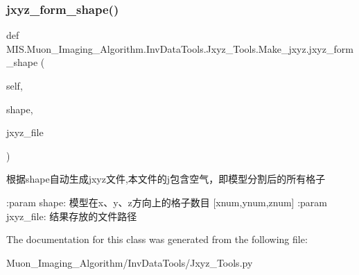 \subsubsection{\texorpdfstring{jxyz\+\_\+form\+\_\+shape()}{jxyz\_form\_shape()}}
{\footnotesize\ttfamily def M\+I\+S.\+Muon\+\_\+\+Imaging\+\_\+\+Algorithm.\+Inv\+Data\+Tools.\+Jxyz\+\_\+\+Tools.\+Make\+\_\+jxyz.\+jxyz\+\_\+form\+\_\+shape (\begin{DoxyParamCaption}\item[{}]{self,  }\item[{}]{shape,  }\item[{}]{jxyz\+\_\+file }\end{DoxyParamCaption})}

\begin{DoxyVerb}根据shape自动生成jxyz文件,本文件的j包含空气，即模型分割后的所有格子

:param shape: 模型在x、y、z方向上的格子数目 [xnum,ynum,znum]
:param jxyz_file: 结果存放的文件路径
\end{DoxyVerb}
 

The documentation for this class was generated from the following file\+:\begin{DoxyCompactItemize}
\item 
Muon\+\_\+\+Imaging\+\_\+\+Algorithm/\+Inv\+Data\+Tools/Jxyz\+\_\+\+Tools.\+py\end{DoxyCompactItemize}
